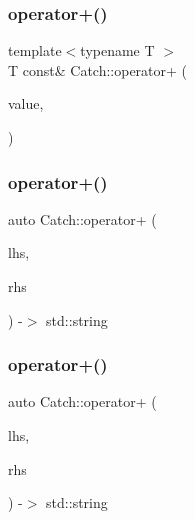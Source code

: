 \mbox{\label{namespace_catch_a5e95b3c47a7618db3649dc39b0bb9004}} 
\subsubsection{\texorpdfstring{operator+()}{operator+()}\hspace{0.1cm}{\footnotesize\ttfamily [1/4]}}
{\footnotesize\ttfamily template$<$typename T $>$ \\
T const\& Catch\+::operator+ (\begin{DoxyParamCaption}\item[{T const \&}]{value,  }\item[{\mbox{\hyperlink{struct_catch_1_1_stream_end_stop}{Stream\+End\+Stop}}}]{ }\end{DoxyParamCaption})}

\mbox{\label{namespace_catch_a3a766cb0b8c792c9151baaaf1e8003eb}} 
\subsubsection{\texorpdfstring{operator+()}{operator+()}\hspace{0.1cm}{\footnotesize\ttfamily [2/4]}}
{\footnotesize\ttfamily auto Catch\+::operator+ (\begin{DoxyParamCaption}\item[{\mbox{\hyperlink{class_catch_1_1_string_ref}{String\+Ref}} const \&}]{lhs,  }\item[{\mbox{\hyperlink{class_catch_1_1_string_ref}{String\+Ref}} const \&}]{rhs }\end{DoxyParamCaption}) -\/$>$  std\+::string}

\mbox{\label{namespace_catch_ab7bdb68d0e4329df79e293f9207b55e9}} 
\subsubsection{\texorpdfstring{operator+()}{operator+()}\hspace{0.1cm}{\footnotesize\ttfamily [3/4]}}
{\footnotesize\ttfamily auto Catch\+::operator+ (\begin{DoxyParamCaption}\item[{\mbox{\hyperlink{class_catch_1_1_string_ref}{String\+Ref}} const \&}]{lhs,  }\item[{char const $\ast$}]{rhs }\end{DoxyParamCaption}) -\/$>$  std\+::string}

